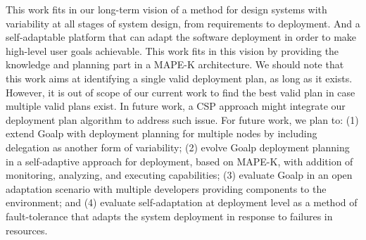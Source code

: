 This work fits in our long-term vision of a method for design systems with variability at all stages of system design, from requirements to deployment. And a self-adaptable platform that can adapt the software deployment in order to make high-level user goals achievable. This work fits in this vision by providing the knowledge and planning part in a MAPE-K\cite{kephart_vision_2003} architecture.
We should note that this work aims at identifying a single valid deployment plan, as long as it exists. However, it is out of scope of our current work to find the best valid plan in case multiple valid plans exist. In future work, a CSP approach might integrate our deployment plan algorithm to address such issue.
For future work, we plan to: (1) extend Goalp with deployment planning for multiple nodes by including delegation as another form of variability;  (2) evolve Goalp deployment planning in a self-adaptive approach for deployment, based on MAPE-K, with addition of monitoring, analyzing, and executing capabilities; (3) evaluate Goalp in an open adaptation scenario with multiple developers providing components to the environment; and (4) evaluate self-adaptation at deployment level as a method of fault-tolerance that adapts the system deployment in response to failures in resources.



